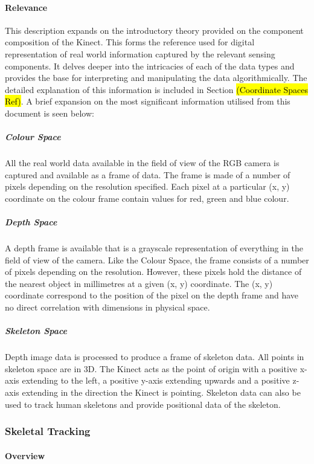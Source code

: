 \paragraph{Relevance}
This description expands on the introductory theory provided on the component composition of the Kinect. This forms the reference used for digital representation of real world information captured by the relevant sensing components. It delves deeper into the intricacies of each of the data types and provides the base for interpreting and manipulating the data algorithmically. The detailed explanation of this information is included in Section \hl{(Coordinate Spaces Ref)}. A brief expansion on the most significant information utilised from this document is seen below: 

\subparagraph{Colour Space}
All the real world data available in the field of view of the RGB camera is captured and available as a frame of data. The frame is made of a number of pixels depending on the resolution specified. Each pixel at a particular (x, y) coordinate on the colour frame contain values for red, green and blue colour.

\subparagraph{Depth Space}
A depth frame is available that is a grayscale representation of everything in the field of view of the camera. Like the Colour Space, the frame consists of a number of pixels depending on the resolution. However, these pixels hold the distance of the nearest object in millimetres at a given (x, y) coordinate. The (x, y) coordinate correspond to the position of the pixel on the depth frame and have no direct correlation with dimensions in physical space.
	
\subparagraph{Skeleton Space}
Depth image data is processed to produce a frame of skeleton data. All points in skeleton space are in 3D. The Kinect acts as the point of origin with a positive x-axis extending to the left, a positive y-axis extending upwards and a positive z-axis extending in the direction the Kinect is pointing. Skeleton data can also be used to track human skeletons and provide positional data of the skeleton.

\subsubsection{Skeletal Tracking \cite{msdnSkelTrack2017}}

\paragraph{Overview}



